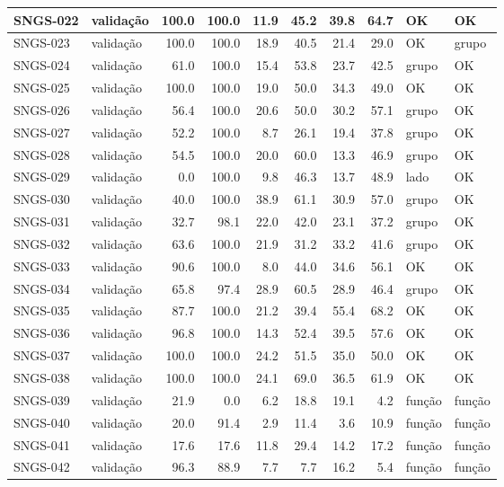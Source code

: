\begin{small}
\begin{longtable}{|l|l|r|r|r|r|r|r|l|l|}
SNGS-022 & validação & 100.0 & 100.0 & 11.9 & 45.2 & 39.8 & 64.7 & OK & OK \\ \hline
SNGS-023 & validação & 100.0 & 100.0 & 18.9 & 40.5 & 21.4 & 29.0 & OK & grupo \\ \hline
SNGS-024 & validação & 61.0 & 100.0 & 15.4 & 53.8 & 23.7 & 42.5 & grupo & OK \\ \hline
SNGS-025 & validação & 100.0 & 100.0 & 19.0 & 50.0 & 34.3 & 49.0 & OK & OK \\ \hline
SNGS-026 & validação & 56.4 & 100.0 & 20.6 & 50.0 & 30.2 & 57.1 & grupo & OK \\ \hline
SNGS-027 & validação & 52.2 & 100.0 & 8.7 & 26.1 & 19.4 & 37.8 & grupo & OK \\ \hline
SNGS-028 & validação & 54.5 & 100.0 & 20.0 & 60.0 & 13.3 & 46.9 & grupo & OK \\ \hline
SNGS-029 & validação & 0.0 & 100.0 & 9.8 & 46.3 & 13.7 & 48.9 & lado & OK \\ \hline
SNGS-030 & validação & 40.0 & 100.0 & 38.9 & 61.1 & 30.9 & 57.0 & grupo & OK \\ \hline
SNGS-031 & validação & 32.7 & 98.1 & 22.0 & 42.0 & 23.1 & 37.2 & grupo & OK \\ \hline
SNGS-032 & validação & 63.6 & 100.0 & 21.9 & 31.2 & 33.2 & 41.6 & grupo & OK \\ \hline
SNGS-033 & validação & 90.6 & 100.0 & 8.0 & 44.0 & 34.6 & 56.1 & OK & OK \\ \hline
SNGS-034 & validação & 65.8 & 97.4 & 28.9 & 60.5 & 28.9 & 46.4 & grupo & OK \\ \hline
SNGS-035 & validação & 87.7 & 100.0 & 21.2 & 39.4 & 55.4 & 68.2 & OK & OK \\ \hline
SNGS-036 & validação & 96.8 & 100.0 & 14.3 & 52.4 & 39.5 & 57.6 & OK & OK \\ \hline
SNGS-037 & validação & 100.0 & 100.0 & 24.2 & 51.5 & 35.0 & 50.0 & OK & OK \\ \hline
SNGS-038 & validação & 100.0 & 100.0 & 24.1 & 69.0 & 36.5 & 61.9 & OK & OK \\ \hline
SNGS-039 & validação & 21.9 & 0.0 & 6.2 & 18.8 & 19.1 & 4.2 & função & função \\ \hline
SNGS-040 & validação & 20.0 & 91.4 & 2.9 & 11.4 & 3.6 & 10.9 & função & função \\ \hline
SNGS-041 & validação & 17.6 & 17.6 & 11.8 & 29.4 & 14.2 & 17.2 & função & função \\ \hline
SNGS-042 & validação & 96.3 & 88.9 & 7.7 & 7.7 & 16.2 & 5.4 & função & função \\ \hline

\end{longtable}
\end{small}
